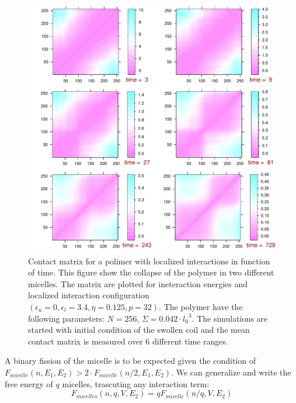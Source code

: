 \documentclass[12pt,a4paper,notitlepage]{article}
\begin{document}
\begin{figure}[h!]
\centering
\includegraphics[width=11.5cm]{unif8contact}
\caption{Contact matrix for a polimer with localized interactions in
  function of time. This figure show the collapse of the polymer in
  two different micelles. The
  matrix are plotted for ineteraction energies and localized
  interaction configuration $(\epsilon_u = 0,
  \epsilon_l = 3.4, \eta = 0.125, p = 32)$. The
  polymer have the following parameters: $N = 256$, $\Sigma = 0.042
  \cdot {l_0}^3$. The simulations are started with
  initial condition of the swollen coil and the mean contact matrix
  is measured over $6$ different time ranges.} 
\label{fig:unif8contact}
\end{figure}

A binary fission of the micelle is to be expected given the condition of
$F_{micelle}(n, E_1, E_2) > 2 \cdot F_{micelle}(n/2, E_1, E_2)$. We
can generalize and write the free energy of $q$ micelles, trascuting
any interaction term:
\begin{equation}
F_{micelles}(n, q, V, E_2) = q F_{micelle}(n/q, V, E_2)
\label{eq:fission}
\end{equation}
\end{document}
